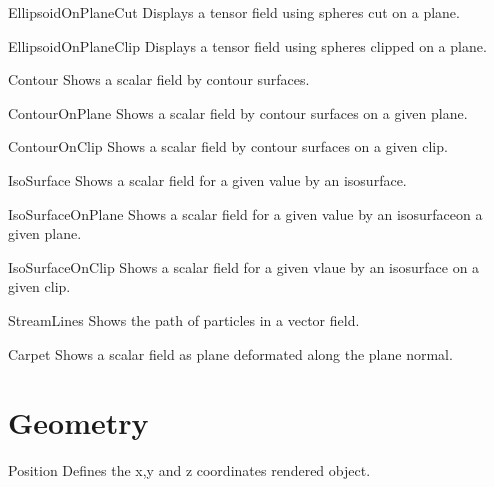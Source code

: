 \begin{classdesc}{EllipsoidOnPlaneCut}{}
 Displays a tensor field using spheres cut on a
        plane.
\end{classdesc}

\begin{classdesc}{EllipsoidOnPlaneClip}{}
 Displays a tensor field using spheres clipped 
        on a plane.
\end{classdesc}

        
\begin{classdesc}{Contour}{}
 Shows a scalar field by contour surfaces. 
\end{classdesc}

\begin{classdesc}{ContourOnPlane}{}
 Shows a scalar field by contour surfaces on 
a given plane.
\end{classdesc}

\begin{classdesc}{ContourOnClip}{}
 Shows a scalar field by contour surfaces on 
a given clip.
\end{classdesc}

\begin{classdesc}{IsoSurface}{}
 Shows a scalar field for a given value by 
an isosurface.
\end{classdesc}

\begin{classdesc}{IsoSurfaceOnPlane}{}
 Shows a scalar field for a given value by 
an isosurfaceon a given plane.
\end{classdesc}

\begin{classdesc}{IsoSurfaceOnClip}{}
 Shows a scalar field for a given vlaue by 
an isosurface on a given clip.
\end{classdesc}

\begin{classdesc}{StreamLines}{}
 Shows the path of particles in a vector field.
\end{classdesc}

\begin{classdesc}{Carpet}{}
 Shows a scalar field as plane deformated along 
the plane normal.
\end{classdesc}

\section{Geometry}
\begin{classdesc}{Position}{}
 Defines the x,y and z coordinates rendered object.
\end{classdesc}

